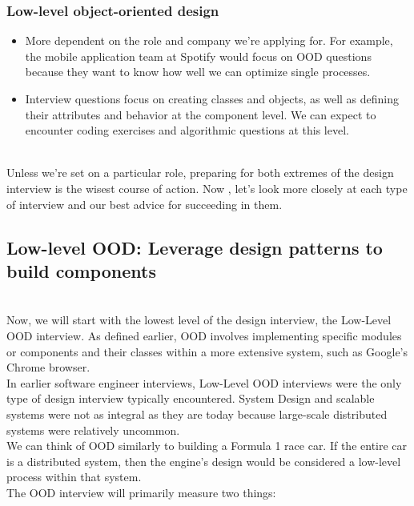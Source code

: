 \subsubsection{Low-level object-oriented design}\label{OuyXxeW3dcq7JP3JEkCqS}

\begin{itemize}
\item
\protect{}\label{8n4GRE-zpqN7hJUKKDgWn}
More dependent on the role and company we're applying for. For example, the mobile application team at Spotify would focus on OOD questions because they want to know how well we can optimize single processes.
\item
\protect{}\label{-oSv-RG5qADoXwMXNLL0g}
Interview questions focus on creating classes and objects, as well as defining their attributes and behavior at the component level. We can expect to encounter coding exercises and algorithmic questions at this level.
\end{itemize}
\\
Unless we're set on a particular role, preparing for both extremes of the design interview is the wisest course of action. Now , let's look more closely at each type of interview and our best advice for succeeding in them.

\subsection{Low-level OOD: Leverage design patterns to build components}\label{YAqeJM3ugwwNQyxSBufCH}
\\
Now, we will start with the lowest level of the design interview, the Low-Level OOD interview. As defined earlier, OOD involves implementing specific modules or components and their classes within a more extensive system, such as Google's Chrome browser.
\\
In earlier software engineer interviews, Low-Level OOD interviews were the only type of design interview typically encountered. System Design and scalable systems were not as integral as they are today because large-scale distributed systems were relatively uncommon.
\\
We can think of OOD similarly to building a Formula 1 race car. If the entire car is a distributed system, then the engine's design would be considered a low-level process within that system.
\\
The OOD interview will primarily measure two things:

